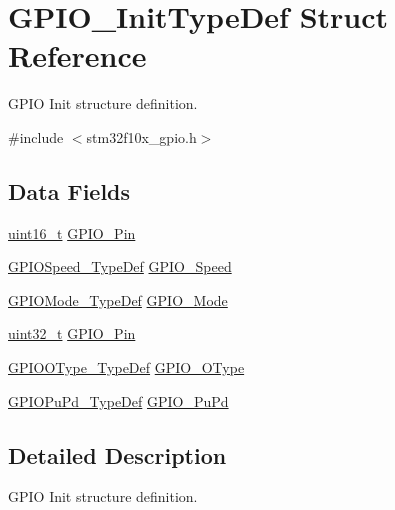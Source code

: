\hypertarget{struct_g_p_i_o___init_type_def}{\section{G\-P\-I\-O\-\_\-\-Init\-Type\-Def Struct Reference}
\label{struct_g_p_i_o___init_type_def}
}


G\-P\-I\-O Init structure definition.  




{\ttfamily \#include $<$stm32f10x\-\_\-gpio.\-h$>$}

\subsection*{Data Fields}
\begin{DoxyCompactItemize}
\item 
\hyperlink{stdint_8h_a273cf69d639a59973b6019625df33e30}{uint16\-\_\-t} \hyperlink{struct_g_p_i_o___init_type_def_a0beb7bf54bbf5fff56f49d8beba2e3df}{G\-P\-I\-O\-\_\-\-Pin}
\item 
\hyperlink{group___output___maximum__frequency__enumeration_ga062ad92b67b4a1f301c161022cf3ba8e}{G\-P\-I\-O\-Speed\-\_\-\-Type\-Def} \hyperlink{struct_g_p_i_o___init_type_def_ac05832cacebc861a9acf5294d702c16b}{G\-P\-I\-O\-\_\-\-Speed}
\item 
\hyperlink{stm32f10x__gpio_8h_a1347339e1c84a196fabbb31205eec5d4}{G\-P\-I\-O\-Mode\-\_\-\-Type\-Def} \hyperlink{struct_g_p_i_o___init_type_def_a55bd77e335c2bfeec9caa5dc922b791b}{G\-P\-I\-O\-\_\-\-Mode}
\item 
\hyperlink{stdint_8h_a435d1572bf3f880d55459d9805097f62}{uint32\-\_\-t} \hyperlink{struct_g_p_i_o___init_type_def_a0beb7bf54bbf5fff56f49d8beba2e3df}{G\-P\-I\-O\-\_\-\-Pin}
\item 
\hyperlink{group___output__type__enumeration_gae74212e8d66c389f47326b06bdf6d2ab}{G\-P\-I\-O\-O\-Type\-\_\-\-Type\-Def} \hyperlink{struct_g_p_i_o___init_type_def_af48c56f3e56e71204c8904ea29f5181b}{G\-P\-I\-O\-\_\-\-O\-Type}
\item 
\hyperlink{group___configuration___pull-_up___pull-_down__enumeration_gafb7ecd99c44b4fd702d669304a36c2c8}{G\-P\-I\-O\-Pu\-Pd\-\_\-\-Type\-Def} \hyperlink{struct_g_p_i_o___init_type_def_aad62942c003bc2083d37f10f6f39bd5f}{G\-P\-I\-O\-\_\-\-Pu\-Pd}
\end{DoxyCompactItemize}


\subsection{Detailed Description}
G\-P\-I\-O Init structure definition. 

